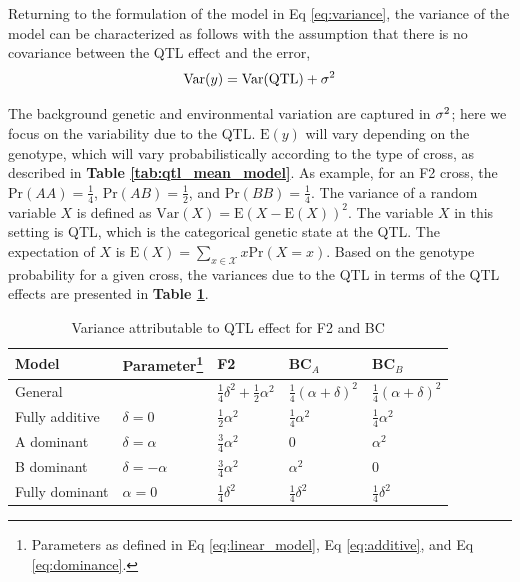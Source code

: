 Returning to the formulation of the model in Eq \ref{eq:variance}, the variance of the model can be characterized as follows with the assumption that there is no covariance between the QTL effect and the error,
\begin{equation}
	\text{Var}(y) = \text{Var}(\text{QTL}) + \sigma^{2}
    \label{eq:variance}
\end{equation}

The background genetic and environmental variation are captured in $\sigma^{2}$; here we focus on the variability due to the QTL. $\text{E}(y)$ will vary depending on the genotype, which will vary probabilistically according to the type of cross, as described in \textbf{Table \ref{tab:qtl_mean_model}}. As example, for an F2 cross, the $\text{Pr}(AA) = \frac{1}{4}$, $\text{Pr}(AB) = \frac{1}{2}$, and $\text{Pr}(BB) = \frac{1}{4}$. The variance of a random variable $X$ is defined as $\text{Var}(X) = \text{E}(X - \text{E}(X))^{2}$. The variable $X$ in this setting is QTL, which is the categorical genetic state at the QTL. The expectation of $X$ is $\text{E}(X) = \sum_{x \in \mathcal{X}}x\text{Pr}(X=x)$. Based on the genotype probability for a given cross, the variances due to the QTL in terms of the QTL effects are presented in \textbf{Table \ref{tab:qtl_variance_model}}.

\begin{table}
\renewcommand{\familydefault}{\sfdefault}\normalfont
\begin{minipage}{\textwidth}
\centering
\caption{Variance attributable to QTL effect for F2 and BC
\label{tab:qtl_variance_model}}
\end{minipage}
\begin{minipage}{\textwidth}
\begin{tabularx}{\textwidth}{XXXXX}
\hline
Model & 
Parameter\footnote{Parameters as defined in Eq \ref{eq:linear_model}, Eq \ref{eq:additive}, and Eq \ref{eq:dominance}.} & 
F2 & BC$_{A}$ & BC$_{B}$ \\
\hline
General & & $\frac{1}{4}\delta^{2} + \frac{1}{2}\alpha^{2}$ & $\frac{1}{4}(\alpha + \delta)^{2}$ & $\frac{1}{4}(\alpha + \delta)^{2}$ \\
Fully additive & $\delta = 0$ & $\frac{1}{2}\alpha^{2}$ & $\frac{1}{4}\alpha^{2}$ & $\frac{1}{4}\alpha^{2}$ \\
A dominant & $\delta = \alpha$ & $\frac{3}{4}\alpha^{2}$ & $0$ & $\alpha^{2}$ \\
B dominant & $\delta = -\alpha$ & $\frac{3}{4}\alpha^{2}$ & $\alpha^{2}$ & $0$ \\
Fully dominant & $\alpha = 0$ & $\frac{1}{4}\delta^{2}$ & $\frac{1}{4}\delta^{2}$ & $\frac{1}{4}\delta^{2}$ \\
\hline
\end{tabularx}
\end{minipage}
\end{table}

